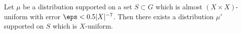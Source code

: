 \begin{theorem}\label{thm:almost_support_uniform}
Let $\mu$ be a distribution supported on a set $S \subset G$ which is
almost $(X \times X)$-uniform with error $\eps < 0.5 |X|^{-7}$. Then
there exists a distribution $\mu'$ supported on $S$ which is $X$-uniform.
\end{theorem}
